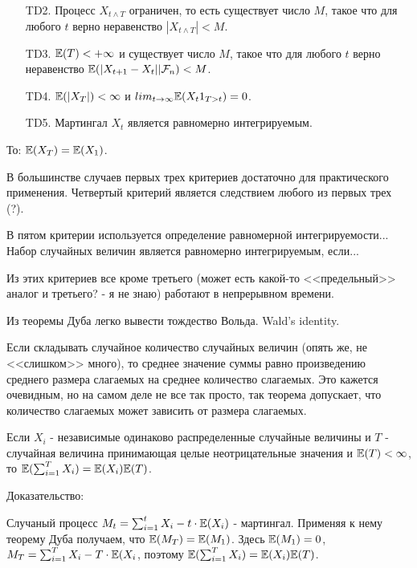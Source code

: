 {\begin{itemize}
\item [TD2.] Процесс $X_{t\wedge T}$ ограничен, то есть существует число $M$, такое что для любого $t$ верно неравенство $|X_{t\wedge T}|<M$. 

\item [TD3.] $\mathbb{E}(T)<+\infty$ и существует число $M$, такое что для любого $t$ верно неравенство $\mathbb{E}(|X_{t+1}-X_{t}||\mathcal{F}_{n})<M$.

\item [TD4.] $\mathbb{E}(|X_{T}|)<\infty$ и $lim_{t\rightarrow\infty}\mathbb{E}(X_{t}1_{T>t})=0$.

\item [TD5.] Мартингал $X_{t}$ является равномерно интегрируемым.

\end{itemize}


То: $\mathbb{E}(X_{T})=\mathbb{E}(X_{1})$.

В большинстве случаев первых трех критериев достаточно для практического применения.
Четвертый критерий является следствием любого из первых трех (?).

В пятом критерии используется определение равномерной интегрируемости...
Набор случайных величин является равномерно интегрируемым, если...


Из этих критериев все кроме третьего (может есть какой-то <<предельный>> аналог и третьего? - я не знаю) работают в непрерывном времени.

Из теоремы Дуба легко вывести тождество Вольда. Wald's identity.
 
Если складывать случайное количество случайных величин (опять же, не <<слишком>> много), то среднее значение суммы равно произведению среднего размера слагаемых на среднее количество слагаемых. Это кажется очевидным, но на самом деле не все так просто, так теорема допускает, что количество слагаемых может зависить от размера слагаемых.

Если $X_{i}$ - независимые одинаково распределенные случайные величины и $T$ - случайная величина принимающая целые неотрицательные значения и $\mathbb{E}(T)<\infty$, то $\mathbb{E}(\sum_{i=1}^{T}X_{i})=\mathbb{E}(X_{i})\mathbb{E}(T)$.

Доказательство:

Случаный процесс $M_{t}=\sum_{i=1}^{t}X_{i}-t\cdot \mathbb{E}(X_{i})$ - мартингал. Применяя к нему теорему Дуба получаем, что $\mathbb{E}(M_{T})=\mathbb{E}(M_{1})$. Здесь $\mathbb{E}(M_{1})=0$, $M_{T}=\sum_{i=1}^{T}X_{i}-T\cdot \mathbb{E}(X_{i}$, поэтому $\mathbb{E}(\sum_{i=1}^{T}X_{i})=\mathbb{E}(X_{i})\mathbb{E}(T)$.





}
